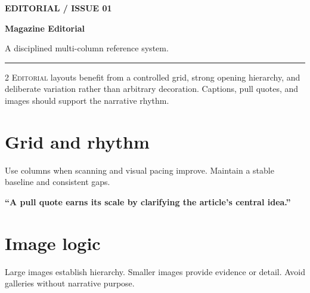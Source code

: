 \documentclass[10.5pt,a4paper]{scrartcl}
\begin{document}
{\small\sffamily\bfseries\color{Accent} EDITORIAL / ISSUE 01\par}
{\fontsize{32}{36}\selectfont\bfseries Magazine Editorial\par}
{\large\color{Muted} A disciplined multi-column reference system.\par}
\vspace{1.2em}\hrule\vspace{1em}
\begin{multicols}{2}
\lettrine[lines=3]{E}{ditorial} layouts benefit from a controlled grid, strong opening hierarchy,
and deliberate variation rather than arbitrary decoration. Captions, pull quotes, and images should
support the narrative rhythm.
\section*{Grid and rhythm}
Use columns when scanning and visual pacing improve. Maintain a stable baseline and consistent gaps.
\columnbreak
{\Large\sffamily\bfseries\color{Accent} ``A pull quote earns its scale by clarifying the article's central idea.''\par}
\vspace{1em}
\section*{Image logic}
Large images establish hierarchy. Smaller images provide evidence or detail. Avoid galleries without narrative purpose.
\end{multicols}
\end{document}

